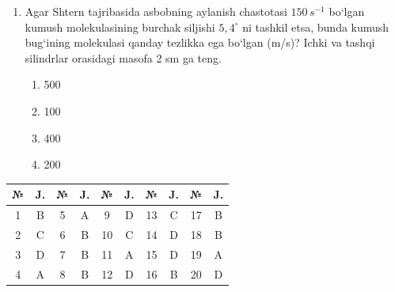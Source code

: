 \begin{enumerate}
\item Agar Shtern tajribasida asbobning aylanish chastotasi $150 \, s^{-1}$ bo‘lgan kumush molekulasining burchak siljishi $5,4^\circ$ ni tashkil etsa, bunda kumush bug‘ining molekulasi qanday tezlikka ega bo‘lgan (m/s)? Ichki va tashqi silindrlar orasidagi masofa 2 sm ga teng.
\begin{enumerate}[label=\Alph*)]
\item 500
\item 100
\item 400
\item 200
\end{enumerate}

\end{enumerate}



\begin{table}[!ht]
\centering
\begin{tabular}{|c|c|c|c|c|c|c|c|c|c|}
\hline
№ & J. & № & J. & № & J. & № & J. & № & J. \\ \hline
1 & B & 5 & A & 9 & D & 13 & C & 17 & B \\ \hline
2 & C & 6 & B & 10 & C & 14 & D & 18 & B \\ \hline
3 & D & 7 & B & 11 & A & 15 & D & 19 & A \\ \hline
4 & A & 8 & B & 12 & D & 16 & B & 20 & D \\ \hline
\end{tabular}
\end{table}
